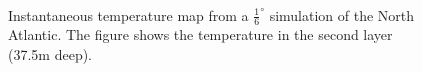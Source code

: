 \begin{figure}
\\
\caption{Instantaneous temperature map from a $\frac{1}{6}^{\circ }$
simulation of the North Atlantic. The figure
shows the temperature in the second layer (37.5m
deep).}
\label{fig:ocean-gyres}
\end{figure}

